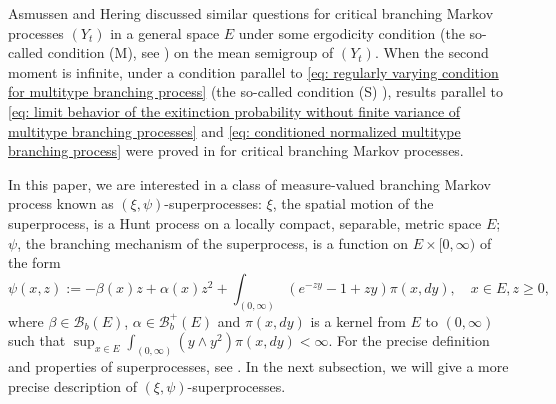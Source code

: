\documentclass[12pt, a4paper]{amsart}
\theoremstyle{definition}
\numberwithin{equation}{section}
\begin{document}
	Asmussen and Hering \cite[Section~6.3~and~6.4]{AsmussenHering1983Branching} discussed similar questions for critical branching Markov processes $(Y_t)$ in a general space $E$ under some ergodicity condition (the so-called condition (M), see \cite[p.~156]{AsmussenHering1983Branching}) on the mean semigroup of $(Y_t)$.
	When the second moment is infinite, under a condition  parallel  to \eqref{eq: regularly varying condition for multitype branching process} (the so-called condition (S) \cite[p.~207]{AsmussenHering1983Branching}), results parallel to \eqref{eq: limit behavior of the exitinction probability without finite variance of multitype branching processes} and \eqref{eq: conditioned normalized multitype branching process} were proved in \cite[Theorem~4.2]{AsmussenHering1983Branching} for critical branching Markov processes.

    In this paper, we are interested in a class of measure-valued branching Markov process known as $(\xi, \psi)$-superprocesses:
    $\xi$, the spatial motion of the superprocess, is a Hunt process on a locally compact, separable, metric space $E$; 
    $\psi$, the branching mechanism of the superprocess, 
    is a function on $E \times [0,\infty)$ of the form
\[ \label{eq: branching mechanism}
	\psi(x,z):=
	- \beta(x) z + \alpha (x) z^2 + \int_{(0,\infty)} (e^{-zy} - 1 + zy) \pi(x,dy),
	\quad x\in E, z\geq 0,
\]
	where $\beta \in \mathscr B_b(E)$, $\alpha \in \mathscr B^+_b(E)$ and $\pi(x,dy)$ is a kernel from $E$ to $(0,\infty)$ such that $\sup_{x\in E} \int_{(0,\infty)} (y\wedge y^2) \pi(x,dy) < \infty$.
	For the precise definition and properties of superprocesses, see \cite{Li2011Measure-valued}.
	In the next subsection, we will give a more precise description of $(\xi, \psi)$-superprocesses.
\end{document}

